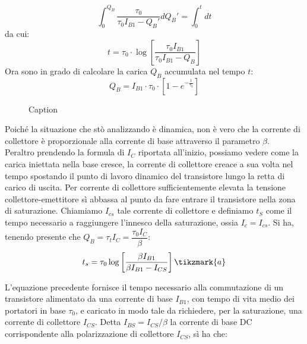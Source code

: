 \begin{equation}
    \int_0^{Q_B} \dfrac{\tau_0 }{\tau_0 I_{B1}-Q_B'} dQ_B'= \int_0^t dt
\end{equation}
%
da cui:
%
\begin{equation}
    t=\tau_0 \cdot \log{\left[ \dfrac{\tau_0 I_{B1}}{\tau_0 I_{B1}-Q_B}\right]}
\end{equation}
%
Ora sono in grado di calcolare la carica $Q_B$ accumulata nel tempo $t$:
\begin{equation}
    Q_B= I_{B1} \cdot \tau_0 \cdot \left[ 1- e^{-\frac{t}{\tau_0}}\right]
\end{equation}
%
\begin{figure}[h]
    \centering
    \begin{tikzpicture}
        
    \end{tikzpicture}
    \caption{Caption}
    \label{fig:enter-label}
\end{figure}
%
Poiché la situazione che stò analizzando è dinamica, non è vero che la corrente di collettore
è proporzionale alla corrente di base attraverso il parametro $\beta$. \\
Peraltro prendendo la formula di $I_C$ riportata all'inizio, possiamo vedere come la carica iniettata nella base cresce, la corrente di collettore creace a sua volta nel tempo spostando il punto di lavoro dinamico del transistore lungo la retta di carico di uscita. Per corrente di collettore sufficientemente elevata la tensione
collettore-emettitore sì abbassa al punto da fare entrare il transistore nella zona
di saturazione. Chiamiamo $I_{cs}$ tale corrente di collettore e definiamo $t_S$ come il
tempo necessario a raggiungere l'innesco della saturazione, ossia $I_c = I_{cs}$. Si ha, tenendo presente che $Q_B=\tau_t I_C=\dfrac{\tau_0 I_C}{\beta}$:
\begin{equation}
    t_s = \tau_0 \log{\left[ \dfrac{\beta I_{B1}}{\beta I_{B1}-I_{CS}}\right] \tikzmark{a}} 
\end{equation}

L'equazione precedente fornisce il tempo necessario alla commutazione di
un transistore alimentato da una corrente di base $I_{B1}$, con tempo di vita medio
dei portatori in base $\tau_0$, e caricato in modo tale da richiedere, per la saturazione, una corrente di collettore $I_{CS}$. Detta $I_{BS} = I_{CS}/\beta$ la corrente di base DC
corrispondente alla polarizzazione di collettore $I_{CS}$, sì ha che: 


